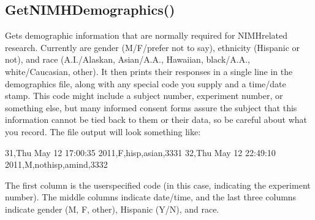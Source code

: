 \documentclass[letterpaper,10pt,english]{sphinxmanual}
\begin{document}
\ignorespaces 

\subsection{GetNIMHDemographics()}
\label{\detokenize{reference/utility:getnimhdemographics}}\label{\detokenize{reference/utility:index-17}}
\sphinxAtStartPar
{}

\sphinxAtStartPar
{}

\sphinxAtStartPar
Gets demographic information that are normally required for NIMH\sphinxhyphen{}related research.  Currently are gender (M/F/prefer not to say), ethnicity (Hispanic or not), and race (A.I./Alaskan, Asian/A.A., Hawaiian, black/A.A., white/Caucasian, other).               It then prints their responses in a single line in the demographics file, along with any special code you supply and a time/date stamp. This code might include a subject number, experiment number, or something else, but many informed consent forms assure the subject that this information cannot be tied back to them or their data, so be careful about what you record. The file output will look something like:

\begin{sphinxVerbatim}[commandchars=\\\{\}]
\PYGZhy{}\PYGZhy{}\PYGZhy{}\PYGZhy{}  31,Thu May 12 17:00:35 2011,F,hisp,asian,3331 32,Thu May 12 22:49:10 2011,M,nothisp,amind,3332 \PYGZhy{}\PYGZhy{}\PYGZhy{}\PYGZhy{}

     The first column is the user\PYGZhy{}specified code (in this    case, indicating the experiment number).  The middle columns    indicate date/time, and the last three columns indicate         gender (M, F, other), Hispanic (Y/N), and race.
\end{sphinxVerbatim}

\sphinxAtStartPar
{}

\begin{sphinxVerbatim}[commandchars=\\\{\}]
\end{sphinxVerbatim}

\sphinxAtStartPar
{}

\begin{sphinxVerbatim}[commandchars=\\\{\}]
\end{sphinxVerbatim}
\end{document}
